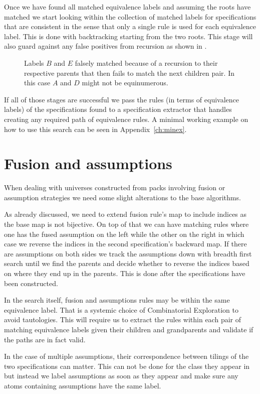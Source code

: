 Once we have found all matched equivalence labels and assuming the roots have matched we start looking within the collection of matched labels for specifications that are consistent in the sense that only a single rule is used for each equivalence label. This is done with backtracking starting from the two roots. This stage will also guard against any false positives from recursion as shown in .

\begin{figure}[ht!]
    \centering
    
    \caption{Labels $B$ and $E$ falsely matched because of a recursion to their respective parents that then fails to match the next children pair. In this case $A$ and $D$ might not be equinumerous.}
    \label{fig:recfalsepos}
\end{figure}

If all of those stages are successful we pass the rules (in terms of equivalence labels) of the specifications found to a specification extractor that handles creating any required path of equivalence rules. A minimal working example on how to use this search can be seen in Appendix~\ref{ch:minex}.


\section{Fusion and assumptions}
When dealing with universes constructed from packs involving fusion or assumption strategies we need some slight alterations to the base algorithms. 

As already discussed, we need to extend fusion rule's map to include indices as the base map is not bijective. On top of that we can have matching rules where one has the fused assumption on the left while the other on the right in which case we reverse the indices in the second specification's backward map. If there are assumptions on both sides we track the assumptions down with breadth first search until we find the parents and decide whether to reverse the indices based on where they end up in the parents. This is done after the specifications have been constructed.

In the search itself, fusion and assumptions rules may be within the same equivalence label. That is a systemic choice of Combinatorial Exploration to avoid tautologies. This will require us to extract the rules within each pair of matching equivalence labels given their children and grandparents and validate if the paths are in fact valid.

In the case of multiple assumptions, their correspondence between tilings of the two specifications can matter. This can not be done for the class they appear in but instead we label assumptions as soon as they appear and make sure any atoms containing assumptions have the same label.